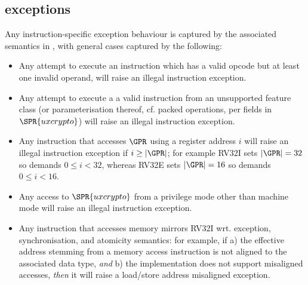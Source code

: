 \subsection{\XCRYPTO exceptions}
\label{sec:spec:exception}


Any instruction-specific exception behaviour is captured by the associated
semantics in , with general cases captured by
the following:

\begin{itemize}
\item Any attempt to execute 
      an \XCRYPTO instruction which has a valid opcode but at least one invalid operand,
      will raise an 
      illegal instruction exception.
\item Any attempt to execute a
      a valid \XCRYPTO instruction from an unsupported feature class (or parameterisation thereof, cf. packed operations, per fields in $\SPR{uxcrypto}$)
      will raise an 
      illegal instruction exception.
\item Any instruction that accesses $\GPR$ using a register address $i$ 
      will raise an
      illegal instruction exception
      if $i \geq |\GPR|$; for example
      RV32I sets $|\GPR| = 32$ so demands $0 \leq i < 32$,
      whereas
      RV32E sets $|\GPR| = 16$ so demands $0 \leq i < 16$.
\item Any access to
      $\SPR{uxcrypto}$
      from a privilege mode other than machine mode
      will raise an 
      illegal instruction exception.
\item Any instruction that accesses memory mirrors RV32I wrt. exception,
      synchronisation, and atomicity semantics: for example, if
      a) the effective address stemming from a memory access instruction
         is not aligned to the associated data type, 
         {\em  and}
      b) the implementation does not support misaligned accesses,
         {\em then} it 
      will raise a 
      load/store address misaligned exception.
\end{itemize}

